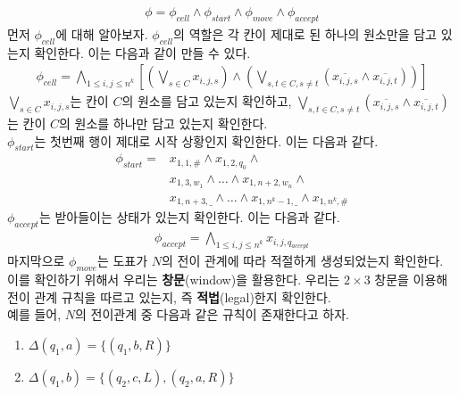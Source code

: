 \documentclass[b5paper, 11pt]{book}
\theoremstyle{definition}
\newenvironment{pf*}{\pushQED{\qed}\pf}
{\popQED\endpf}
\begin{document}
\begin{pf*}
\begin{align*}
        \phi = \phi_{cell} \wedge \phi_{start} \wedge \phi_{move} \wedge \phi_{accept}
    \end{align*}
    먼저 $\phi_{cell}$에 대해 알아보자. $\phi_{cell}$의 역할은 각 칸이 제대로 된 하나의 원소만을 담고 있는지 확인한다. 이는 다음과 같이 만들 수 있다.
    \begin{align*}
        \phi_{cell} = \bigwedge_{1 \le i,j \le n^k} \left[\left(\bigvee_{s\in C} x_{i,j,s}\right)
    \wedge \left(\bigvee_{s,t \in C, s \neq t} \left(\overline{x_{i,j,s}} \wedge 
    \overline{x_{i,j,t}}\right) \right)\right]
    \end{align*}
    $\bigvee_{s\in C} x_{i,j,s}$는 칸이 $C$의 원소를 담고 있는지 확인하고, $\bigvee_{s,t \in C, s \neq t} \left(\overline{x_{i,j,s}} \wedge \overline{x_{i,j,t}}\right)$는 칸이 $C$의 원소를 하나만 담고 있는지 확인한다. \\ 
    $\phi_{start}$는 첫번째 행이 제대로 시작 상황인지 확인한다. 이는 다음과 같다.
    \begin{align*}
        \phi_{start} = &x_{1,1,\#} \wedge x_{1,2,q_0} \wedge \\ 
        &x_{1,3,w_1} \wedge \ldots \wedge x_{1,n+2, w_n} \wedge \\ 
        &x_{1,n+3,\_} \wedge \ldots \wedge x_{1,n^k - 1 , \_} \wedge x_{1, n^k , \#}
    \end{align*} 
    $\phi_{accept}$는 받아들이는 상태가 있는지 확인한다. 이는 다음과 같다.
    \begin{align*}
        \phi_{accept} = \bigwedge_{1 \le i,j \le n^k} x_{i,j,q_{accept}}
    \end{align*}
    마지막으로 $\phi_{move}$는 도표가 $N$의 전이 관계에 따라 적절하게 생성되었는지 확인한다. 이를 확인하기 위해서 우리는 \textbf{창문}(window)을 활용한다. 우리는 $2 \times 3$ 창문을 이용해 전이 관계 규칙을 따르고 있는지, 즉 \textbf{적법}(legal)한지 확인한다.\\
    예를 들어, $N$의 전이관계 중 다음과 같은 규칙이 존재한다고 하자. 
    \begin{enumerate}
        \item $\Delta(q_1, a) = \{(q_1, b, R)\}$
        \item $\Delta(q_1, b) = \{(q_2,c,L),(q_2,a,R)\}$
    \end{enumerate}
    \begin{table}[!ht]
        \begin{subtable}[h]{0.3\textwidth}
            \centering
            \begin{tabular}{ | c | c | c|}
            \hline 

\end{tabular}
\end{subtable}
\end{table}
\end{pf*}
\end{document}
